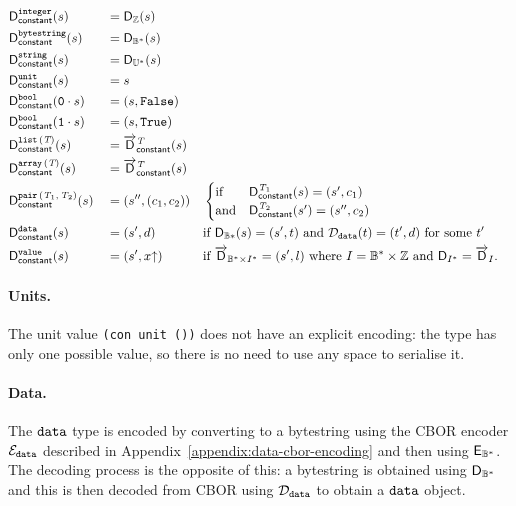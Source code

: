 \begin{alignat*}{3}
  &\Dconstant{\ty{integer}}(s)              &&= \D_{\Z}(s) \\
  &\Dconstant{\ty{bytestring}}(s)           &&= \D_{\B^*}(s) \\
  &\Dconstant{\ty{string}}(s)               &&= \D_{\U^*}(s) \\
  &\Dconstant{\ty{unit}}(s)                 &&= s  \\
  &\Dconstant{\ty{bool}}(\bits{0} \cdot s)  &&= (s, \texttt{False}) \\
  &\Dconstant{\ty{bool}}(\bits{1} \cdot s)  &&= (s, \texttt{True}) \\
  &\Dconstant{\listOf{\tn}}(s)              &&= \Dlist^{\tn}_{\mathsf{constant}}(s) \\
  &\Dconstant{\arrayOf{\tn}}(s)             &&= \Darray^{\tn}_{\mathsf{constant}}(s) \\
  &\Dconstant{\pairOf{\tn_1}{\tn_2}}(s)     &&= (s'', (c_1, c_2))
  && \begin{cases}
       \text{if}  & \Dconstant{\tn_1}(s) = (s', c_1) \\
       \text{and} & \Dconstant{\tn_2}(s') = (s'', c_2)
     \end{cases}\\
  &\Dconstant{\ty{data}}(s)                 &&= (s', d) &&
                                           \text{if $\D_{\B*}(s) = (s', t)$
                                            and $\dData(t) = (t', d)$ for some $t'$}\\
& \Dconstant{\ty{value}}(s)                 && = (s', \unflatten{x})
                                             &&\text{if $\Dlist_{\B^* \times I^*} = (s',l)$
                                             where $I=\B^* \times \Z$ and $\D_{I^*} = \Dlist_I$}.
\end{alignat*}

\paragraph{Units.} The unit value \texttt{(con unit ())} does not have
an explicit encoding: the type has only one possible value, so there is no need
to use any space to serialise it.

\paragraph{Data.} The $\mathtt{data}$ type is encoded by converting to a bytestring using the CBOR
encoder $\mathcal{E}_{\mathtt{data}}$ described in Appendix~\ref{appendix:data-cbor-encoding} and
then using $\mathsf{E}_{\mathbb{B}^*}$.  The decoding process is the opposite of this: a
bytestring is obtained using $\mathsf{D}_{\mathbb{B}^*}$ and this is then decoded from CBOR
using $\mathcal{D}_{\mathtt{data}}$ to obtain a $\mathtt{data}$ object.

